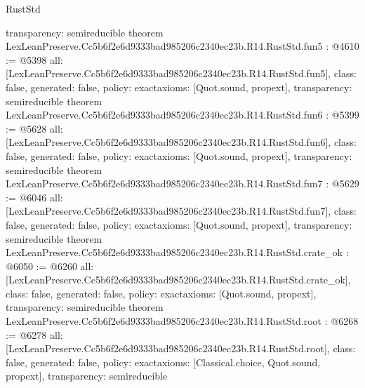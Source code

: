\begin{lexlean}{RustStd}
\begin{coremodule}
{  transparency: semireducible
}
theorem LexLeanPreserve.Cc5b6f2e6d9333bad985206c2340ec23b.R14.RustStd.fun5 : @4610 := @5398 {
  all: [LexLeanPreserve.Cc5b6f2e6d9333bad985206c2340ec23b.R14.RustStd.fun5],
  class: false,
  generated: false,
  policy: exact{axioms: [Quot.sound, propext]},
  transparency: semireducible
}
theorem LexLeanPreserve.Cc5b6f2e6d9333bad985206c2340ec23b.R14.RustStd.fun6 : @5399 := @5628 {
  all: [LexLeanPreserve.Cc5b6f2e6d9333bad985206c2340ec23b.R14.RustStd.fun6],
  class: false,
  generated: false,
  policy: exact{axioms: [Quot.sound, propext]},
  transparency: semireducible
}
theorem LexLeanPreserve.Cc5b6f2e6d9333bad985206c2340ec23b.R14.RustStd.fun7 : @5629 := @6046 {
  all: [LexLeanPreserve.Cc5b6f2e6d9333bad985206c2340ec23b.R14.RustStd.fun7],
  class: false,
  generated: false,
  policy: exact{axioms: [Quot.sound, propext]},
  transparency: semireducible
}
theorem LexLeanPreserve.Cc5b6f2e6d9333bad985206c2340ec23b.R14.RustStd.crate_ok : @6050 := @6260 {
  all: [LexLeanPreserve.Cc5b6f2e6d9333bad985206c2340ec23b.R14.RustStd.crate_ok],
  class: false,
  generated: false,
  policy: exact{axioms: [Quot.sound, propext]},
  transparency: semireducible
}
theorem LexLeanPreserve.Cc5b6f2e6d9333bad985206c2340ec23b.R14.RustStd.root : @6268 := @6278 {
  all: [LexLeanPreserve.Cc5b6f2e6d9333bad985206c2340ec23b.R14.RustStd.root],
  class: false,
  generated: false,
  policy: exact{axioms: [Classical.choice, Quot.sound, propext]},
  transparency: semireducible
}


\end{coremodule}
\end{lexlean}
